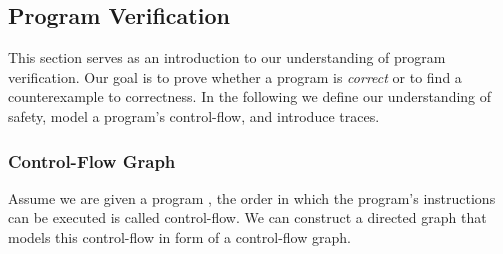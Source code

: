\subsection{Program Verification}
This section serves as an introduction to our understanding of program verification. Our goal is to prove whether a program is \textsl{correct} or to find a counterexample to correctness. In the following we define our understanding of safety, model a program's control-flow, and introduce traces.
\subsubsection{Control-Flow Graph}
 Assume we are given a program \prg, the order in which the program's instructions can be executed is called control-flow. We can construct a directed graph that models this control-flow in form of a control-flow graph.
 
